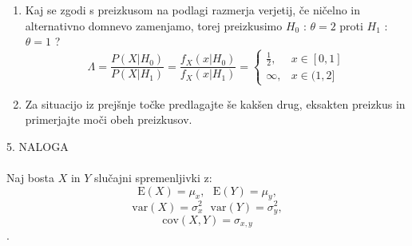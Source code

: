 \documentclass[a4paper]{article}
\begin{document}
\begin{enumerate}[label=(\alph*)]
\item Kaj se zgodi s preizkusom na podlagi razmerja verjetij, če ničelno in alternativno domnevo zamenjamo, torej preizkusimo $H_{0}$ : $\theta = 2$ proti $H_1$ : $\theta = 1$ ?
$$\Lambda = \frac{P(X|H_{0})}{P(X|H_{1})} = \frac{f_X(x|H_0)}{f_X(x|H_{1})} = \left\{
  \begin{array}{lr}
    \frac{1}{2}, & x \in [0,1]\\
    \infty, & x \in (1,2]
  \end{array}
\right.  $$


\item Za situacijo iz prejšnje točke predlagajte še kakšen drug, eksakten preizkus in primerjajte moči obeh preizkusov.

\end{enumerate}

\large{5. NALOGA} \\ \\
Naj bosta $X$ in $Y$ slučajni spremenljivki z:
    \begin{equation*} \text{E}(X) = \mu_x, \ \ \  \text{E}(Y) = \mu_y, \end{equation*}
     \begin{equation*}\text{var}(X) = \sigma_x^2 \ \ \ \text{var}(Y) = \sigma_y^2, \end{equation*}
     \begin{equation*}\text{cov}(X,Y) = \sigma_{x,y} \end{equation*}.
\end{document}
